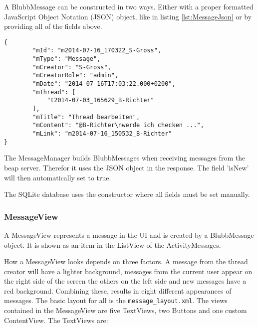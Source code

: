 \documentclass[12pt,a4paper,oneside]{report}
\newcommand{\beapServer}{beap server}
\newcommand{\code}[1]{\lstinline{#1}}
\begin{document}
A BlubbMessage can be constructed in two ways. Either with a proper formatted JavaScript Object Notation (JSON) object, like in listing \ref{lst:MessageJson} or by providing all of the fields above. 
\begin{lstlisting}[caption=Message JSON object, label=lst:MessageJson]
{
        "mId": "m2014-07-16_170322_S-Gross",
        "mType": "Message",
        "mCreator": "S-Gross",
        "mCreatorRole": "admin",
        "mDate": "2014-07-16T17:03:22.000+0200",
        "mThread": [
            "t2014-07-03_165629_B-Richter"
        ],
        "mTitle": "Thread bearbeiten",
        "mContent": "@B-Richter\nwerde ich checken ...",
        "mLink": "m2014-07-16_150532_B-Richter"
}

\end{lstlisting}
The MessageManager builds BlubbMessages when receiving messages from the \beapServer{}. Therefor it uses the JSON object in the response. The field 'isNew' will then automatically set to true.


The SQLite database uses the constructor where all fields must be set manually. 

\subsubsection{MessageView}
A MessageView represents a message in the UI and is created by a BlubbMessage object. It is shown as an item in the ListView of the ActivityMessages.


How a MessageView looks depends on three factors. A message from the thread creator will have a lighter background, messages from the current user appear on the right side of the screen the others on the left side and new messages have a red background. Combining these, results in eight different appearances of messages.
The basic layout for all is the \code{message_layout.xml}. The views contained in the MessageView are five TextViews, two Buttons and one custom ContentView.
The TextViews are:
\end{document}
